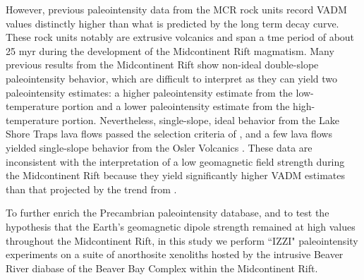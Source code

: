 \documentclass[draft]{agujournal2019}
\begin{document}
However, previous paleointensity data from the MCR rock units \cite{Pesonen1983a, Kulakov2013a, Sprain2018a} record VADM values distinctly higher than what is predicted by the long term decay curve. These rock units notably are extrusive volcanics and span a tme period of about 25 myr during the development of the Midcontinent Rift magmatism. Many previous results from the Midcontinent Rift show non-ideal double-slope paleointensity behavior, which are difficult to interpret as they can yield two paleointensity estimates: a higher paleointensity estimate from the low-temperature portion and a lower paleointensity estimate from the high-temperature portion. Nevertheless, single-slope, ideal behavior from the Lake Shore Traps \cite{Kulakov2013a} lava flows passed the selection criteria of , and a few lava flows yielded single-slope behavior from the Osler Volcanics \cite{Sprain2018a}. These data are inconsistent with the interpretation of a low geomagnetic field strength during the Midcontinent Rift because they yield significantly higher VADM estimates than that projected by the trend from . 

To further enrich the Precambrian paleointensity database, and to test the hypothesis that the Earth's geomagnetic dipole strength remained at high values throughout the Midcontinent Rift, in this study we perform ``IZZI" paleointensity experiments \cite{Tauxe2004a} on a suite of anorthosite xenoliths hosted by the intrusive Beaver River diabase of the Beaver Bay Complex within the Midcontinent Rift. 



\end{document}
